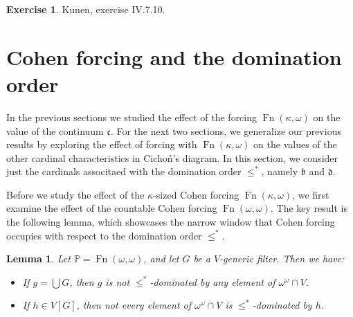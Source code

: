 \documentclass[11pt,oneside]{amsbook}
\newcommand{\PP}{\mathbb P}
\DeclareMathOperator{\Fn}{Fn}
\theoremstyle{definition}
\newtheorem{exerc}{Exercise}[section]
\theoremstyle{plain}
\newtheorem{lem}[thm]{Lemma}
\theoremstyle{definition}
\theoremstyle{remark}
\numberwithin{equation}{section}
\numberwithin{figure}{section}
\begin{document}
\begin{exerc}
  Kunen, exercise IV.7.10.
\end{exerc}


\section{Cohen forcing and the domination order}

In the previous sections we studied the effect of the forcing $\Fn(\kappa,\omega)$ on the value of the continuum $\mathfrak c$. For the next two sections, we generalize our previous results by exploring the effect of forcing with $\Fn(\kappa,\omega)$ on the values of the other cardinal characteristics in Cicho\'n's diagram. In this section, we consider just the cardinals associtaed with the domination order $\leq^*$, namely $\mathfrak b$ and $\mathfrak d$.

Before we study the effect of the $\kappa$-sized Cohen forcing $\Fn(\kappa,\omega)$, we first examine the effect of the countable Cohen forcing $\Fn(\omega,\omega)$. The key result is the following lemma, which showcases the narrow window that Cohen forcing occupies with respect to the domination order $\leq^*$.

\begin{lem}
  \label{lem:cohen-dominating}
  Let $\PP=\Fn(\omega,\omega)$, and let $G$ be a $V$-generic filter. Then we have:
  \begin{itemize}
  \item If $g=\bigcup G$, then $g$ is not $\leq^*$-dominated by any element of $\omega^\omega\cap V$.
  \item If $h\in V[G]$, then not every element of $\omega^\omega\cap V$ is $\leq^*$-dominated by $h$.
  \end{itemize}
\end{lem}
\end{document}
